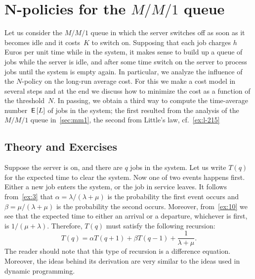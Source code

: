 \documentclass[companion]{subfiles}
\begin{document}
\section{N-policies for the $M/M/1$ queue}
\label{sec:n-policies}


Let us consider the $M/M/1$ queue in which the server switches off as soon as it becomes idle and it costs~$K$ to switch on.
Supposing that each job charges $h$ Euros per unit time while in the system, it makes sense to build up a queue of jobs while the server is idle, and after some time switch on the server to process jobs until the system is empty again.
In particular, we analyze the influence of the $N$-policy on the long-run average cost.
For this we make a cost model in several steps and at the end we discuss how to minimize the cost as a function of the threshold~$N$.
In passing, we obtain a third way to compute the time-average number $\,\mathsf{E}\left[L\right]$ of jobs in the system; the first resulted from the analysis of the $M/M/1$ queue in~\cref{sec:mm1}, the second from Little's law, cf.~\cref{ex:l-215}

{\subsection*{Theory and Exercises}
}



Suppose the server is on, and there are $q$ jobs in the system.
Let us write $T(q)$ for the expected time to clear the system.
Now one of two events happens first.
Either a new job enters the system, or the job in service leaves.
It follows from~\cref{ex:3} that $\alpha=\lambda/(\lambda+\mu)$ is the probability the first event occurs and $\beta=\mu/(\lambda+\mu)$ is the probability the second occurs.
Moreover, from~\cref{ex:10} we see that the expected time to either an arrival or a departure, whichever is first, is $1/(\mu+\lambda)$.
Therefore, $T(q)$ must satisfy the following recursion:
\begin{equation}
  \label{eq:92}
  T(q) = \alpha T(q+1) + \beta T(q-1) + \frac{1}{\lambda+\mu}. 
\end{equation}
The reader should note that this type of recursion is a difference equation.
Moreover, the ideas behind its derivation are very similar to the ideas used in dynamic programming.
\end{document}
